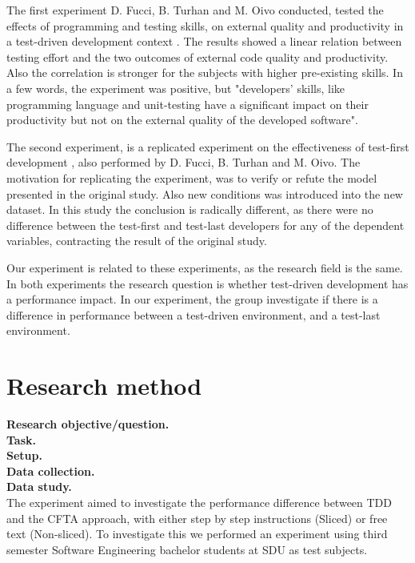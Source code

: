 \documentclass{sig-alternate-05-2015}
\begin{document}
The first experiment D. Fucci, B. Turhan and M. Oivo conducted, tested the effects of programming and testing skills, on external quality and productivity in a test-driven development context \cite{fucci1}. The results showed a linear relation between testing effort and the two outcomes of external code quality and productivity. Also the correlation is stronger for the subjects with higher pre-existing skills. In a few words, the experiment was positive, but "developers' skills, like programming language and unit-testing have a significant impact on their productivity but not on the external quality of the developed software".

The second experiment, is a replicated experiment on the effectiveness of test-first development \cite{fucci2}, also performed by D. Fucci, B. Turhan and M. Oivo. The motivation for replicating the experiment, was to verify or refute the model presented in the original study. Also new conditions was introduced into the new dataset.
In this study the conclusion is radically different, as there were no difference between the test-first and test-last developers for any of the dependent variables, contracting the result of the original study.

Our experiment is related to these experiments, as the research field is the same. In both experiments \cite{fucci1, fucci2} the research question is whether test-driven development has a performance impact. In our experiment, the group investigate if there is a difference in performance between a test-driven environment, and a test-last environment.

\section{Research method}

\label{sec:Research method}
\textbf{Research objective/question.}\\
\textbf{Task.}\\
\textbf{Setup.}\\
\textbf{Data collection.}\\
\textbf{Data study.}\\



The experiment aimed to investigate the performance difference between TDD and the CFTA approach, with either step by step instructions (Sliced) or free text (Non-sliced). To investigate this we performed an experiment using third semester Software Engineering bachelor students at SDU as test subjects.
\end{document}
